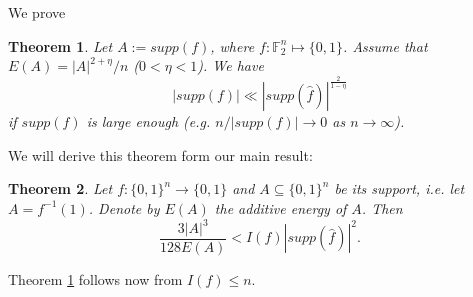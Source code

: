 \documentclass[12pt]{amsart}%
\newtheorem{thm}{\bf Theorem}[section]
\theoremstyle{definition}
\begin{document}
We prove 

\begin{thm}\label{c1} Let $A:=supp(f)$, where $f: \mathbb F^n_2 \mapsto \{0,1\}$. Assume that $E(A)=|A|^{2+\eta}/n$ ($0<\eta<1$). We have 
$$
|supp(f)|\ll|supp(\widehat{f})|^{\frac{2}{1-\eta}}
$$
if $supp(f)$ is large enough (e.g. $n/|supp(f)|\to 0$ as $n\to \infty $).
\end{thm}
We will derive this theorem form our main result:
\begin{thm}\label{T3}
Let $f:\{0,1\}^n \to \{0,1\}$ and $A\subseteq \{0,1\}^n$ be its support, i.e. let $A=f^{-1}(1)$. Denote by $E(A)$ the additive energy of $A$. Then
\begin{equation}\label{1}
\frac{3|A|^3}{128E(A)}<I(f)|supp(\widehat{f})|^2.
\end{equation}
\end{thm}
Theorem \ref{c1} follows now from $I(f)\leq n$.
\end{document}
